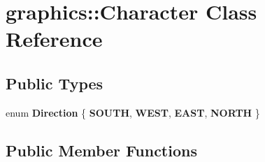 \hypertarget{classgraphics_1_1_character}{\section{graphics\-:\-:Character Class Reference}
\label{classgraphics_1_1_character}
}
\subsection*{Public Types}
\begin{DoxyCompactItemize}
\item 
enum {\bfseries Direction} \{ {\bfseries S\-O\-U\-T\-H}, 
{\bfseries W\-E\-S\-T}, 
{\bfseries E\-A\-S\-T}, 
{\bfseries N\-O\-R\-T\-H}
 \}
\end{DoxyCompactItemize}
\subsection*{Public Member Functions}
